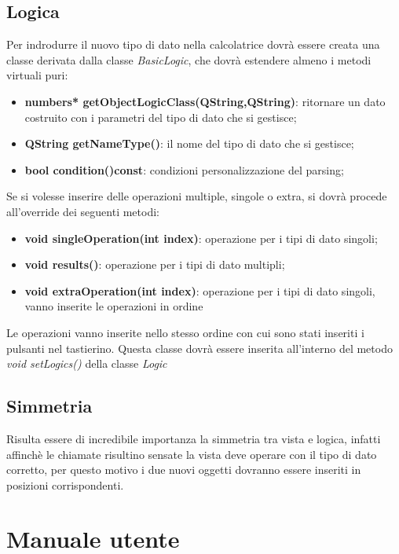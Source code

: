 \documentclass[a4paper,10pt]{article}
\begin{document}
            \subsection{Logica}
            Per indrodurre il nuovo tipo di dato nella calcolatrice dovrà essere creata una classe derivata dalla classe \textit{BasicLogic}, che dovrà estendere almeno i metodi virtuali puri:
            \begin{itemize}
                \item \textbf{numbers* getObjectLogicClass(QString,QString)}: ritornare un dato costruito con i parametri del tipo di dato che si gestisce; 
                \item \textbf{QString getNameType()}: il nome del tipo di dato che si gestisce;
                \item \textbf{bool condition()const}: condizioni personalizzazione del parsing;
            \end{itemize}
            Se si volesse inserire delle operazioni multiple, singole o extra, si dovrà procede all'override dei seguenti metodi:
            \begin{itemize}
                \item \textbf{void singleOperation(int index)}: operazione per i tipi di dato singoli;
                \item \textbf{void results()}: operazione per i tipi di dato multipli;
                \item \textbf{void extraOperation(int index)}: operazione per i tipi di dato singoli, vanno inserite le operazioni in ordine 
            \end{itemize}
            Le operazioni vanno inserite nello stesso ordine con cui sono stati inseriti i pulsanti nel tastierino.
            Questa classe dovrà essere inserita all'interno del metodo \textit{void setLogics()} della classe \textit{Logic}
            \subsection{Simmetria}
            Risulta essere di incredibile importanza la simmetria tra vista e logica, infatti affinchè le chiamate risultino sensate la vista deve operare con il tipo di dato corretto, per questo motivo i due nuovi oggetti dovranno essere inseriti in posizioni corrispondenti.
            
            \section{Manuale utente}
\end{document}
